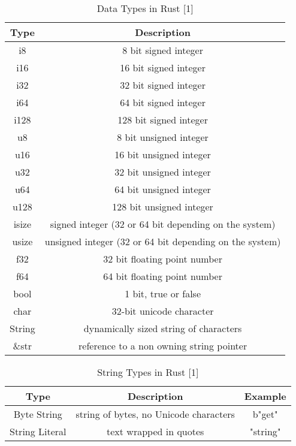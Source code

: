 \documentclass[sigconf,authorversion,nonacm]{acmart}
\begin{document}
\begin{table} [H]
\caption{Data Types in Rust [1]}
    \begin{tabular}{ |c|c| }
    \hline
    Type & Description \\
    \hline
    i8 & 8 bit signed integer \\
    \hline
    i16 & 16 bit signed integer \\
    \hline
    i32 & 32 bit signed integer \\
    \hline
    i64 & 64 bit signed integer \\
    \hline
    i128 & 128 bit signed integer \\
    \hline
    u8 & 8 bit unsigned integer \\
    \hline
    u16 & 16 bit unsigned integer \\
    \hline
    u32 & 32 bit unsigned integer \\
    \hline
    u64 & 64 bit unsigned integer \\
    \hline
    u128 & 128 bit unsigned integer \\
    \hline
    isize & signed integer (32 or 64 bit depending on the system) \\
    \hline
    usize & unsigned integer (32 or 64 bit depending on the system)   \\
    \hline
    f32 & 32 bit floating point number \\
    \hline
    f64 & 64 bit floating point number \\
    \hline
    bool & 1 bit, true or false \\
    \hline
    char & 32-bit unicode character \\
    \hline
    String & dynamically sized string of characters \\
    \hline
    \&str & reference to a non owning string pointer \\
    \hline
    \end{tabular}
\end{table}

\begin{table} [H]
\caption{String Types in Rust [1]}  
    \begin{tabular}{ |c|c|c| }
    \hline
    Type & Description & Example \\
    \hline
    Byte String & string of bytes, no Unicode characters & b"get" \\
    \hline
    String Literal & text wrapped in quotes & "string" \\
    \hline
    \end{tabular}
\end{table}
\end{document}
